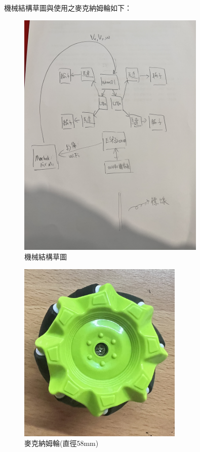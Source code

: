 \documentclass[12pt]{article}       %
\begin{document}
\hspace{2em}機械結構草圖與使用之麥克納姆輪如下：

\begin{figure}[H]
    \centering
    \includegraphics[width=0.8\textwidth, angle=270]{IMG_5917.jpg}     %
    \caption{機械結構草圖}    %
    \label{fig:IMG_5917}    %
\end{figure}

\begin{figure}[H]
    \centering
    \includegraphics[width=0.7\textwidth]{IMG_5906.jpg}     %
    \caption{麥克納姆輪(直徑58mm)}    %
    \label{fig:IMG_5906}    %
\end{figure}
\end{document}
